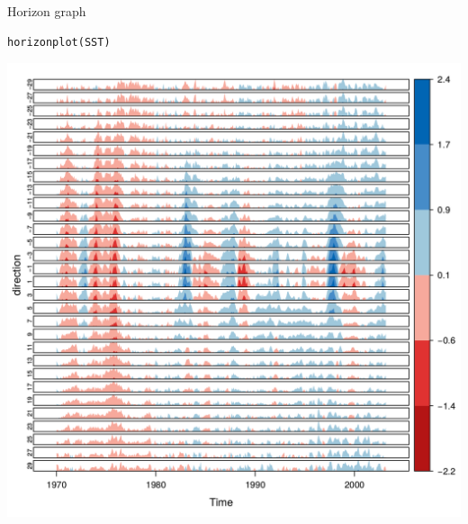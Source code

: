 \documentclass[xcolor={usenames,svgnames,dvipsnames}]{beamer}
\begin{document}
\begin{frame}[fragile,label=sec-17]{Horizon graph}
 \lstset{language=R,numbers=none}
\begin{lstlisting}
horizonplot(SST)
\end{lstlisting}

\begin{center}
\includegraphics[height=0.65\textheight]{figs/horizon.png}
\end{center}
\end{frame}
\end{document}
